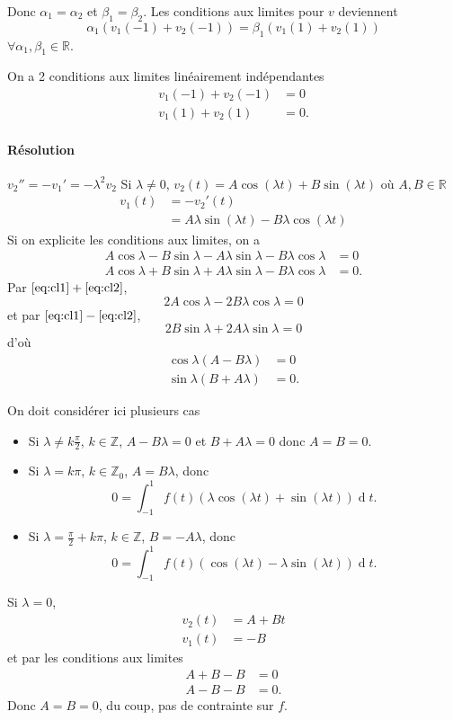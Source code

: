 \documentclass[fontsize=12pt]{article}
\DeclareMathOperator{\newdiff}{d} %
\newcommand{\dif}{\newdiff\!}
\begin{document}
Donc $\alpha_1 = \alpha_2$ et $\beta_1 = \beta_2$.
Les conditions aux limites pour $v$ deviennent
\[\alpha_1(v_1(-1) + v_2(-1)) = \beta_1(v_1(1) + v_2(1))\]
$\forall \alpha_1,\beta_1 \in\mathbb{R}$.

On a 2 conditions aux limites linéairement indépendantes
\begin{align*}
  v_1(-1) + v_2(-1) & = 0\\
  v_1(1) + v_2(1) & = 0.
\end{align*}

\paragraph{Résolution}
$v_2'' = -v_1' = -\lambda^2 v_2$
Si $\lambda \neq 0$,
$v_2(t) = A \cos(\lambda t) + B\sin(\lambda t)$ où $A, B \in \mathbb{R}$
\begin{align*}
  v_1(t) & = -v_2'(t)\\
  & = A\lambda\sin(\lambda t) - B\lambda\cos(\lambda t)
\end{align*}
Si on explicite les conditions aux limites, on a
\begin{align}
  \label{eq:cl1}
  A \cos\lambda - B \sin\lambda - A\lambda \sin\lambda - B\lambda\cos\lambda & = 0\\
  \label{eq:cl2}
  A \cos\lambda + B \sin\lambda + A\lambda \sin\lambda - B\lambda\cos\lambda & = 0.
\end{align}
Par $\eqref{eq:cl1} + \eqref{eq:cl2}$,
\[ 2A\cos\lambda - 2B\lambda\cos\lambda = 0 \]
et par $\eqref{eq:cl1} - \eqref{eq:cl2}$,
\[ 2B\sin\lambda + 2A\lambda\sin\lambda = 0 \]
d'où
\begin{align*}
  \cos\lambda (A - B\lambda) & = 0\\
  \sin\lambda (B + A\lambda) & = 0.
\end{align*}

On doit considérer ici plusieurs cas
\begin{itemize}
  \item Si $\lambda \neq k\frac{\pi}{2}$, $k \in \mathbb{Z}$,
    $A - B\lambda = 0$ et $B + A\lambda = 0$ donc $A = B = 0$.

  \item Si $\lambda = k\pi$, $k \in \mathbb{Z}_0$, $A = B\lambda$,
    donc
    \[ 0 = \int_{-1}^1 f(t) (\lambda \cos(\lambda t) + \sin(\lambda t)) \dif t. \]

  \item Si $\lambda = \frac{\pi}{2} + k\pi$, $k \in \mathbb{Z}$, $B = -A\lambda$,
    donc
    \[ 0 = \int_{-1}^1 f(t) (\cos(\lambda t) - \lambda\sin(\lambda t)) \dif t. \]
\end{itemize}

Si $\lambda = 0$,
\begin{align*}
  v_2(t) & = A + Bt\\
  v_1(t) & = -B
\end{align*}
et par les conditions aux limites
\begin{align*}
  A + B - B & = 0\\
  A - B - B & = 0.
\end{align*}
Donc $A = B = 0$, du coup, pas de contrainte sur $f$.
\end{document}
